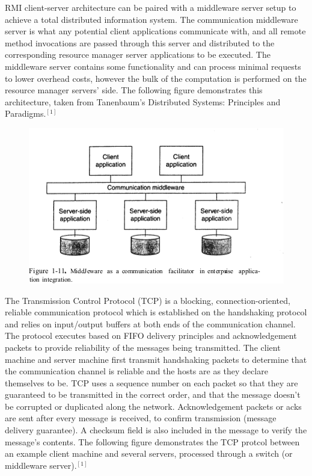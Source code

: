 \documentclass[letterpaper,12pt]{article}
\begin{document}
RMI client-server architecture can be paired with a  middleware server setup to achieve a total distributed information system. The communication middleware server is what any potential client applications communicate with, and all remote method invocations are passed through this server and distributed to the corresponding resource manager server applications to be executed. The middleware server contains some functionality and can process minimal requests to lower overhead costs, however the bulk of the computation is performed on the resource manager servers' side. The following figure demonstrates this architecture, taken from Tanenbaum's Distributed Systems: Principles and Paradigms$.^{[1]}$


\begin{figure}[ht] 
	\centering \includegraphics[width=0.8\columnwidth]{figure1.png}

\end{figure}

The Transmission Control Protocol (TCP) is a blocking, connection-oriented, reliable communication protocol which is established on the handshaking protocol and relies on input/output buffers at both ends of the communication channel. The protocol executes based on FIFO delivery principles and acknowledgement packets to provide reliability of the messages being transmitted. The client machine and server machine first transmit handshaking packets to determine that the communication channel is reliable and the hosts are as they declare themselves to be. TCP uses a sequence number on each packet so that they are guaranteed to be transmitted in the correct order, and that the message doesn't be corrupted or duplicated along the network. Acknowledgement packets or acks are sent after every message is received, to confirm transmission (message delivery guarantee). A checksum field is also included in the message to verify the message's contents. The following figure demonstrates the TCP protcol between an example client machine and several servers, processed through a switch (or middleware server)$.^{[1]}$\\
\end{document}
